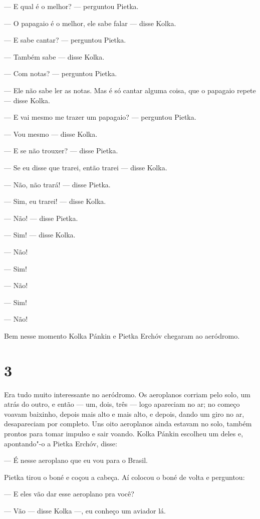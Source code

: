 --- E qual é o melhor? --- perguntou Pietka.

--- O papagaio é o melhor, ele sabe falar --- disse Kolka.

--- E sabe cantar? --- perguntou Pietka.

--- Também sabe --- disse Kolka.

--- Com notas? --- perguntou Pietka.

--- Ele não sabe ler as notas. Mas é só cantar alguma coisa, que o
papagaio repete --- disse Kolka.

--- E vai mesmo me trazer um papagaio? --- perguntou Pietka.

--- Vou mesmo --- disse Kolka.

--- E se não trouxer? --- disse Pietka.

--- Se eu disse que trarei, então trarei --- disse Kolka.

--- Não, não trará! --- disse Pietka.

--- Sim, eu trarei! --- disse Kolka.

--- Não! --- disse Pietka.

--- Sim! --- disse Kolka.

--- Não!

--- Sim!

--- Não!

--- Sim!

--- Não!

Bem nesse momento Kolka Pánkin e Pietka Erchóv chegaram ao aeródromo.

\section{3}

Era tudo muito interessante no aeródromo. Os aeroplanos corriam pelo
solo, um atrás do outro, e então --- um, dois, três --- logo apareciam
no ar; no começo voavam baixinho, depois mais alto e mais alto, e
depois, dando um giro no ar, desapareciam por completo. Uns oito
aeroplanos ainda estavam no solo, também prontos para tomar impulso e
sair voando. Kolka Pánkin escolheu um deles e, apontando"-o a Pietka
Erchóv, disse:

--- É nesse aeroplano que eu vou para o Brasil.

Pietka tirou o boné e coçou a cabeça. Aí colocou o boné de volta e
perguntou:

--- E eles vão dar esse aeroplano pra você?

--- Vão --- disse Kolka ---, eu conheço um aviador lá.

